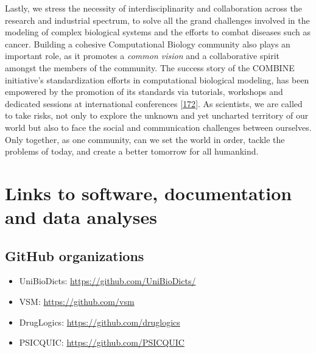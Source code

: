 \documentclass[
  12pt,
]{book}
\providecommand{\tightlist}{%
  \setlength{\itemsep}{0pt}\setlength{\parskip}{0pt}}
\begin{document}
Lastly, we stress the necessity of interdisciplinarity and collaboration across the research and industrial spectrum, to solve all the grand challenges involved in the modeling of complex biological systems and the efforts to combat diseases such as cancer.
Building a cohesive Computational Biology community also plays an important role, as it promotes a \emph{common vision} and a collaborative spirit amongst the members of the community.
The success story of the COMBINE initiative's standardization efforts in computational biological modeling, has been empowered by the promotion of its standards via tutorials, workshops and dedicated sessions at international conferences {[}\protect\hyperlink{ref-Hucka2015}{172}{]}.
As scientists, we are called to take risks, not only to explore the unknown and yet uncharted territory of our world but also to face the social and communication challenges between ourselves.
Only together, as one community, can we set the world in order, tackle the problems of today, and create a better tomorrow for all humankind.

\hypertarget{appendix-appendix}{%
\appendix}


\hypertarget{links-to-software-documentation-and-data-analyses}{%
\chapter*{Links to software, documentation and data analyses}\label{links-to-software-documentation-and-data-analyses}}

\vspace{-10pt}

\hypertarget{github-org-links}{%
\section*{GitHub organizations}\label{github-org-links}}

\begin{itemize}
\tightlist
\item
  UniBioDicts: \url{https://github.com/UniBioDicts/}
\item
  VSM: \url{https://github.com/vsm}
\item
  DrugLogics: \url{https://github.com/druglogics}
\item
  PSICQUIC: \url{https://github.com/PSICQUIC}
\end{itemize}
\end{document}
